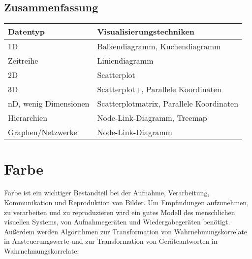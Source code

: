 \documentclass[a4paper, 11pt, accentcolor = tud3b]{tudreport}
\begin{document}
		\section{Zusammenfassung}
			\begin{table}
				\centering
				\begin{tabular}{l|l}
					\textbf{Datentyp}     & \textbf{Visualisierungstechniken}        \\ \hline
					1D                    & Balkendiagramm, Kuchendiagramm           \\
					Zeitreihe             & Liniendiagramm                           \\
					2D                    & Scatterplot                              \\
					3D                    & Scatterplot+, Parallele Koordinaten      \\
					nD, wenig Dimensionen & Scatterplotmatrix, Parallele Koordinaten \\
					Hierarchien           & Node-Link-Diagramm, Treemap              \\
					Graphen/Netzwerke     & Node-Link-Diagramm
				\end{tabular}
			\end{table}

	\chapter{Farbe}
		Farbe ist ein wichtiger Bestandteil bei der Aufnahme, Verarbeitung, Kommunikation und Reproduktion von Bilder. Um Empfindungen aufzunehmen, zu verarbeiten und zu reproduzieren wird ein gutes Modell des menschlichen visuellen Systems, von Aufnahmegeräten und Wiedergabegeräten benötigt. Außerdem werden Algorithmen zur Transformation von Wahrnehmungskorrelate in Ansteuerungswerte und zur Transformation von Geräteantworten in Wahrnehmungskorrelate.
\end{document}
